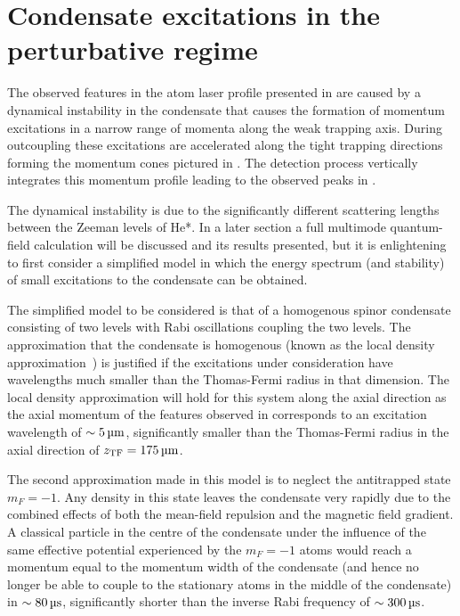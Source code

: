 \section{Condensate excitations in the perturbative regime}
\label{Peaks:PerturbativeApproach}

The observed features in the atom laser profile presented in  are caused by a dynamical instability in the condensate that causes the formation of momentum excitations in a narrow range of momenta along the weak trapping axis. During outcoupling these excitations are accelerated along the tight trapping directions forming the momentum cones pictured in . The detection process vertically integrates this momentum profile leading to the observed peaks in .

The dynamical instability is due to the significantly different scattering lengths between the Zeeman levels of He*. In a later section a full multimode quantum-field calculation will be discussed and its results presented, but it is enlightening to first consider a simplified model in which the energy spectrum (and stability) of small excitations to the condensate can be obtained.

The simplified model to be considered is that of a homogenous spinor condensate consisting of two levels with Rabi oscillations coupling the two levels. The approximation that the condensate is homogenous (known as the local density approximation~\cite{Stamper-Kurn:1999,Zambelli:2000}) is justified if the excitations under consideration have wavelengths much smaller than the Thomas-Fermi radius in that dimension. The local density approximation will hold for this system along the axial direction as the axial momentum of the features observed in  corresponds to an excitation wavelength of $\sim \unit[5]{\micro m}$, significantly smaller than the Thomas-Fermi radius in the axial direction of $z_\text{TF} = \unit[175]{\micro m}$. 

The second approximation made in this model is to neglect the antitrapped state $m_F=-1$. Any density in this state leaves the condensate very rapidly due to the combined effects of both the mean-field repulsion and the magnetic field gradient. A classical particle in the centre of the condensate under the influence of the same effective potential experienced by the $m_F=-1$ atoms would reach a momentum equal to the momentum width of the condensate (and hence no longer be able to couple to the stationary atoms in the middle of the condensate) in $\sim\unit[80]{\micro s}$, significantly shorter than the inverse Rabi frequency of $\sim \unit[300]{\micro s}$.

